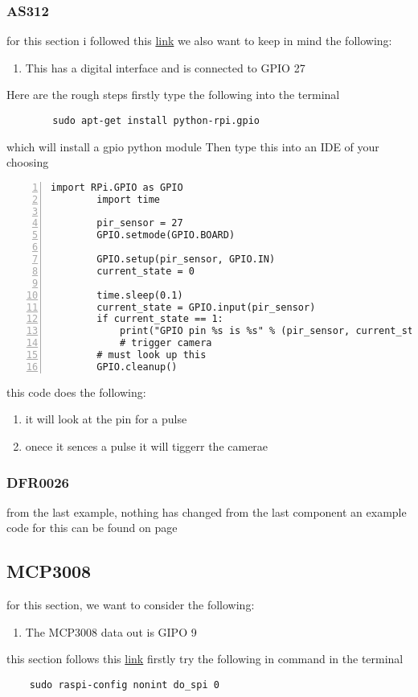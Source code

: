 	\subsubsection{AS312}
	for this section i followed  this \href{https://pimylifeup.com/raspberry-pi-motion-sensor/}{link}
	we also want to keep in mind the following:
	\begin{enumerate}
		\item This has a  digital interface and is connected  to GPIO 27 
	\end{enumerate}
	Here are the rough steps firstly  type the following into the  terminal 
	\begin{verbatim}
		sudo apt-get install python-rpi.gpio
	\end{verbatim}
	which will install a gpio python module
	\newpage
	Then type this into an IDE of your  choosing
	\begin{lstlisting}[style=mystyle,caption={Example code for AS312},numbers=left,firstnumber=1]
		import RPi.GPIO as GPIO
		import time

		pir_sensor = 27
		GPIO.setmode(GPIO.BOARD)

		GPIO.setup(pir_sensor, GPIO.IN)
		current_state = 0
		
		time.sleep(0.1)
		current_state = GPIO.input(pir_sensor)
		if current_state == 1:
			print("GPIO pin %s is %s" % (pir_sensor, current_state))
			# trigger camera
		# must look up this 
		GPIO.cleanup()
	\end{lstlisting}
	this code does the  following:
	\begin{enumerate}
		\item it will look at the  pin for a pulse 
		\item onece it sences a pulse  it will tiggerr  the camerae
	\end{enumerate}
	\subsubsection{DFR0026}	
	from the last example, nothing has changed from the last component
	an example code for this can be found on page \pageref{adc code}
	\subsection{MCP3008}
	for this section, we want to consider the following:
	\begin{enumerate}
		\item The MCP3008 data out is GIPO 9 
	\end{enumerate}
	this section follows this \href{https://randomnerdtutorials.com/raspberry-pi-analog-inputs-python-mcp3008/}{link}
	firstly try the following in command in the terminal 
	\begin{verbatim}
	sudo raspi-config nonint do_spi 0
	\end{verbatim}
	
